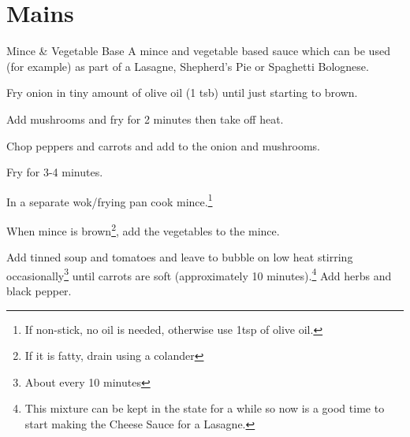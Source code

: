 \documentclass[a4paper,10pt]{article}
\begin{document}
	\section{Mains}
	\begin{recipe}{Mince \& Vegetable Base}
		A mince and vegetable based sauce which can be used (for example) as part of
		a Lasagne, Shepherd's Pie or Spaghetti Bolognese.
		
		\begin{ingredients}{5}
		\end{ingredients}
		
		\begin{steps}
			\step Fry onion in tiny amount of olive oil (1 tsb) until just starting to
			      brown.
			
			\step Add mushrooms and fry for 2 minutes then take off heat.
			
			\step Chop peppers and carrots and add to the onion and mushrooms.
			
			\step Fry for 3-4 minutes.
			
			\step In a separate wok/frying pan cook mince.\footnote{If non-stick, no
			      oil is needed, otherwise use 1tsp of olive oil.}
			
			\step When mince is brown\footnote{If it is fatty, drain using a
			      colander}, add the vegetables to the mince.
			
			\step Add tinned soup and tomatoes and leave to bubble on low heat
			      stirring occasionally\footnote{About every 10 minutes} until carrots
			      are soft (approximately 10 minutes).\footnote{This mixture can be
			      kept in the state for a while so now is a good time to start making
			      the Cheese Sauce for a Lasagne.}
			\step Add herbs and black pepper.
		\end{steps}
	\end{recipe}
	
\end{document}
